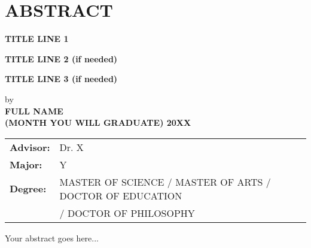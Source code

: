 \section*{ABSTRACT}

\centerline{\bf TITLE LINE 1}
\vspace{-0.4cm}
\centerline{\bf TITLE LINE 2 (if needed)}
\vspace{-0.4cm}
\centerline{\bf TITLE LINE 3 (if needed)}

{\setlength\baselineskip{0.3in}
	\begin{center}
	by\\
	\medskip
	{\bf FULL NAME}\\
	\medskip
	{\bf (MONTH YOU WILL GRADUATE) 20XX}\\
	\end{center}
	\Vspc
	\begin{tabular}{ll}
		{\bf Advisor:} & Dr. X \\
		{\bf Major:} & Y \\
		{\bf Degree:} & MASTER OF SCIENCE / MASTER OF ARTS / DOCTOR OF EDUCATION\\
		& / DOCTOR OF PHILOSOPHY
	\end{tabular}
}

\bigskip \bigskip

Your abstract goes here...
